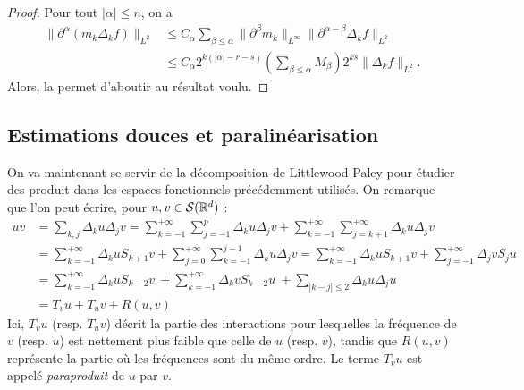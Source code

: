 \documentclass[11pt,a4paper]{article}
\begin{document}
\begin{proof}
Pour tout $|\alpha|\leq n$, on a 
\begin{align*}
\|\partial^\alpha (m_k\Delta_kf)\|_{L^2} &\leq C_\alpha \sum_{\beta \leq \alpha} \|\partial^\beta m_k\|_{L^\infty} \|\partial^{\alpha-\beta}\Delta_kf\|_{L^2} \\
&\leq C_\alpha 2^{k(|\alpha|-r-s)}\left(\sum_{\beta\leq \alpha} M_\beta \right)2^{ks}\|\Delta_kf\|_{L^2}.
\end{align*}
Alors, la  permet d'aboutir au résultat voulu.
\end{proof}
\subsection{Estimations douces et paralinéarisation}
On va maintenant se servir de la décomposition de Littlewood-Paley pour étudier des produit dans les espaces fonctionnels précédemment utilisés. On remarque que l'on peut écrire, pour $u,v \in \mathcal{S}(\mathbb R^d)$ : 
\begin{align*}
uv &=\sum_{k,j}\Delta_ku\Delta_jv = \sum_{k=-1}^{+\infty}\sum_{j=-1}^{p}\Delta_ku\Delta_jv + \sum_{k=-1}^{+\infty}\sum_{j=k+1}^{+\infty}\Delta_ku\Delta_jv \\
&=\sum_{k=-1}^{+\infty}\Delta_kuS_{k+1}v +  \sum_{j=0}^{+\infty}\sum_{k=-1}^{j-1}\Delta_ku\Delta_jv = \sum_{k=-1}^{+\infty}\Delta_kuS_{k+1}v +  \sum_{j=-1}^{+\infty}\Delta_jvS_{j}u \\
&= \sum_{k=-1}^{+\infty}\Delta_kuS_{k-2}v  \ +  \sum_{k=-1}^{+\infty}\Delta_kvS_{k-2}u \ + \sum_{|k-j|\leq 2} \Delta_ku\Delta_ju \\
&= T_vu + T_uv + R(u,v)
\end{align*}
Ici, $T_vu$ (resp. $T_uv$) décrit la partie des interactions pour lesquelles la fréquence de $v$ (resp. $u$) est nettement plus faible que celle de $u$ (resp. $v$), tandis que $R(u,v)$ représente la partie où les fréquences sont du même ordre. Le terme $T_vu$ est appelé \textit{paraproduit} de $u$ par $v$.
\end{document}
